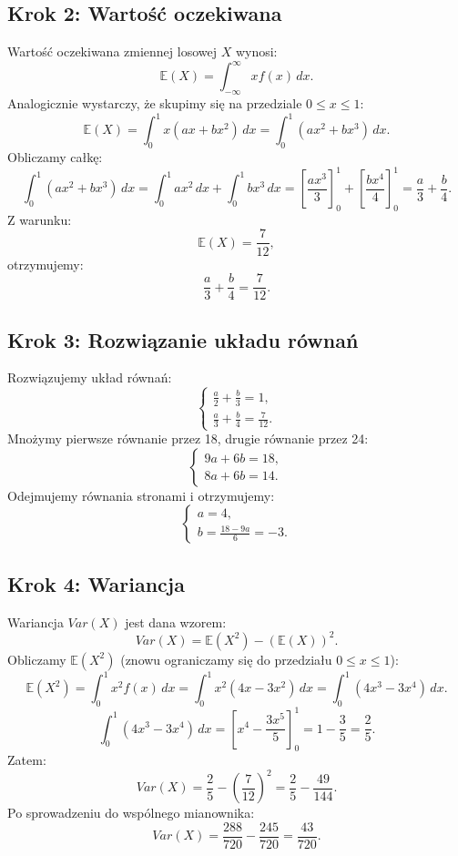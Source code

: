 \documentclass[polish, 8pt]{article}
\begin{document}
\subsection*{Krok 2: Wartość oczekiwana}
Wartość oczekiwana zmiennej losowej \(X\) wynosi:
\[
\mathbb{E}(X) = \int_{-\infty}^\infty x f(x) \, dx.
\]
Analogicznie wystarczy, że skupimy się na przedziale \(0 \leq x \leq 1\):
\[
\mathbb{E}(X) = \int_0^1 x(ax + bx^2) \, dx = \int_0^1 (ax^2 + bx^3) \, dx.
\]
Obliczamy całkę:
\[
\int_0^1 (ax^2 + bx^3) \, dx = \int_0^1 ax^2 \, dx + \int_0^1 bx^3 \, dx = \left[\frac{a x^3}{3}\right]_0^1 + \left[\frac{b x^4}{4}\right]_0^1 = \frac{a}{3} + \frac{b}{4}.
\]
Z warunku:
\[
\mathbb{E}(X) = \frac{7}{12},
\]
otrzymujemy:
\[
\frac{a}{3} + \frac{b}{4} = \frac{7}{12}. \tag{2}
\]

\subsection*{Krok 3: Rozwiązanie układu równań}
Rozwiązujemy układ równań:
\[
\begin{cases} 
\frac{a}{2} + \frac{b}{3} = 1, \\ 
\frac{a}{3} + \frac{b}{4} = \frac{7}{12}.
\end{cases}
\]
Mnożymy pierwsze równanie przez 18, drugie równanie przez 24:
\[
\begin{cases} 
9a + 6b = 18, \\ 
8a + 6b = 14.
\end{cases}
\]
Odejmujemy równania stronami i otrzymujemy:
\[
\begin{cases} 
a = 4, \\ 
b = \frac{18 - 9a}{6} = -3.
\end{cases}
\]

\subsection*{Krok 4: Wariancja}
Wariancja \(Var(X)\) jest dana wzorem:
\[
Var(X) = \mathbb{E}(X^2) - (\mathbb{E}(X))^2.
\]
Obliczamy \(\mathbb{E}(X^2)\) (znowu ograniczamy się do przedziału \(0 \leq x \leq 1\)):
\[
\mathbb{E}(X^2) = \int_0^1 x^2 f(x) \, dx = \int_0^1 x^2(4x - 3x^2) \, dx = \int_0^1 (4x^3 - 3x^4) \, dx.
\]
\[
\int_0^1 (4x^3 - 3x^4) \, dx = \left[x^4 - \frac{3x^5}{5}\right]_0^1 = 1 - \frac{3}{5} = \frac{2}{5}.
\]
Zatem:
\[
Var(X) = \frac{2}{5} - \left(\frac{7}{12}\right)^2 = \frac{2}{5} - \frac{49}{144}.
\]
Po sprowadzeniu do wspólnego mianownika:
\[
Var(X) = \frac{288}{720} - \frac{245}{720} = \frac{43}{720}.
\]
\end{document}
